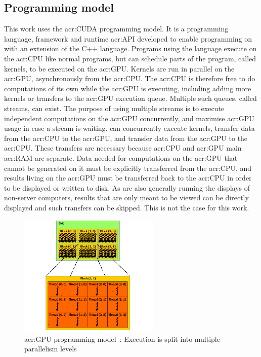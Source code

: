 \subsection{Programming model}\label{subsection:graphics_processing_units:architecture:programming_model}

This work uses the \acrshort{acr:CUDA} programming model. It is a programming language, framework
and runtime \acrfull{acr:API} developed to enable programming on  with an
extension of the C++ language. Programs using the language execute on the \acrshort{acr:CPU} like
normal programs, but can schedule parts of the program, called kernels, to be executed on the
\acrshort{acr:GPU}. Kernels are run in parallel on the \acrshort{acr:GPU}, asynchronously from the
\acrshort{acr:CPU}. The \acrshort{acr:CPU} is therefore free to do computations of its own while the
\acrshort{acr:GPU} is executing, including adding more kernels or transfers to the
\acrshort{acr:GPU} execution queue. Multiple such queues, called streams, can exist. The purpose of
using multiple streams is to execute independent computations on the \acrshort{acr:GPU}
concurrently, and maximise \acrshort{acr:GPU} usage in case a stream is waiting.
 can concurrently execute kernels, transfer data from the \acrshort{acr:CPU} to
the \acrshort{acr:GPU}, and transfer data from the \acrshort{acr:GPU} to the \acrshort{acr:CPU}.
These transfers are necessary because \acrshort{acr:CPU} and \acrshort{acr:GPU} main
\acrlong{acr:RAM} are separate. Data needed for computations on the \acrshort{acr:GPU} that cannot
be generated on it must be explicitly transferred from the \acrshort{acr:CPU}, and results living on
the \acrshort{acr:GPU} must be transferred back to the \acrshort{acr:CPU} in order to be displayed
or written to disk. As  are also generally running the displays of non-server
computers, results that are only meant to be viewed can be directly displayed and such transfers can
be skipped. This is not the case for this work. 

\begin{figure}[H]
    \centering
    \includegraphics[width=0.6\textwidth]{Chapter_graphics_processing_units/media/grid-of-thread-blocks}
    \caption{\Acrshort{acr:GPU} programming model~\cite{Nvidia2021}: Execution is split into multiple parallelism levels}\label{fig:gpu_programming_model}
\end{figure}

